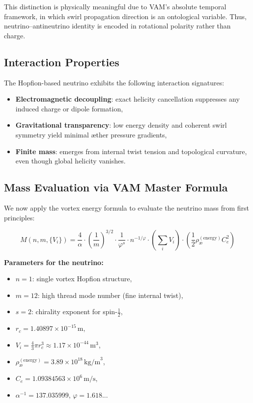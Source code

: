 This distinction is physically meaningful due to VAM’s absolute temporal framework, in which swirl propagation direction is an ontological variable. Thus, neutrino–antineutrino identity is encoded in rotational polarity rather than charge.

\subsection{Interaction Properties}

The Hopfion-based neutrino exhibits the following interaction signatures:

\begin{itemize}
    \item \textbf{Electromagnetic decoupling}: exact helicity cancellation suppresses any induced charge or dipole formation,
    \item \textbf{Gravitational transparency}: low energy density and coherent swirl symmetry yield minimal æther pressure gradients,
    \item \textbf{Finite mass}: emerges from internal twist tension and topological curvature, even though global helicity vanishes.
\end{itemize}

\subsection{Mass Evaluation via VAM Master Formula}

We now apply the vortex energy formula to evaluate the neutrino mass from first principles:

\begin{equation}
\boxed{
M(n, m, \{V_i\}) = \frac{4}{\alpha} \cdot \left( \frac{1}{m} \right)^{3/2} \cdot \frac{1}{\varphi^s} \cdot n^{-1/\varphi} \cdot \left( \sum_i V_i \right) \cdot \left( \frac{1}{2} \rho_\text{\ae}^{(\text{energy})} C_e^2 \right)
}
\end{equation}

\noindent
\textbf{Parameters for the neutrino:}
\begin{itemize}
    \item \(n = 1\): single vortex Hopfion structure,
    \item \(m = 12\): high thread mode number (fine internal twist),
    \item \(s = 2\): chirality exponent for spin-\(\frac{1}{2}\),
    \item \(r_c = 1.40897 \times 10^{-15} \, \text{m}\),
    \item \(V_i = \frac{4}{3} \pi r_c^3 \approx 1.17 \times 10^{-44} \, \text{m}^3\),
    \item \(\rho_\text{\ae}^{(\text{energy})} = 3.89 \times 10^{18} \, \text{kg/m}^3\),
    \item \(C_e = 1.09384563 \times 10^6 \, \text{m/s}\),
    \item \(\alpha^{-1} = 137.035999\), \quad \(\varphi = 1.618...\)
\end{itemize}

